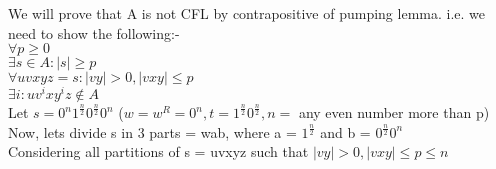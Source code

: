 \documentclass{article}
\begin{document}
We will prove that A is not CFL by contrapositive of pumping lemma. i.e. we need to show the following:- \\
$\forall p \geq 0$ \\
$\exists s \in A : |s| \geq p $ \\
$\forall uvxyz = s : |vy| > 0, |vxy| \leq p$\\
$\exists i : uv^ixy^iz \notin A$\\

Let $s = 0^n 1^{\frac{n}{2}} 0^{\frac{n}{2}} 0^n$ ($w = w^R = 0^n, t = 1^{\frac{n}{2}} 0^{\frac{n}{2}}, n = $ any even number more than p)\\
Now, lets divide s in 3 parts = wab, where a = $1^{\frac{n}{2}}$ and b = $0^{\frac{n}{2}} 0^n$\\
Considering all partitions of s = uvxyz such that $|vy| > 0, |vxy| \leq p \leq n$\\
\end{document}
